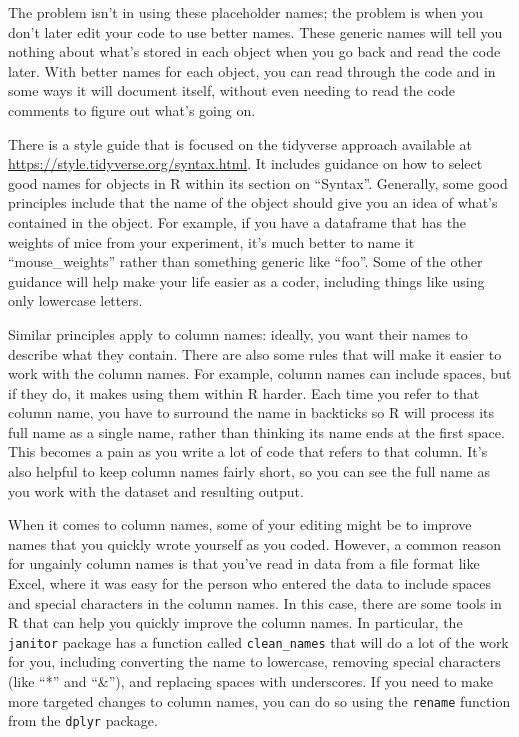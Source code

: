 \documentclass[]{tufte-book}
\begin{document}
The problem isn't in using these placeholder names; the problem is when you
don't later edit your code to use better names. These generic names
will tell you nothing about what's stored in each object when you go back
and read the code later. With better names for each object, you can read through
the code and in some ways it will document itself, without even needing to
read the code comments to figure out what's going on.

There is a style guide that is focused on the tidyverse approach available
at \url{https://style.tidyverse.org/syntax.html}. It includes guidance on how to
select good names for objects in R within its section on ``Syntax''. Generally,
some good principles include that the name of the object should give you an
idea of what's contained in the object. For example, if you have a dataframe
that has the weights of mice from your experiment, it's much better to name
it ``mouse\_weights'' rather than something generic like ``foo''. Some of the
other guidance will help make your life easier as a coder, including things
like using only lowercase letters.

Similar principles apply to column names: ideally, you want
their names to describe what they contain. There are also some rules that will
make it easier to work with the column names. For example, column names can
include spaces, but if they do, it makes using them within R harder. Each time
you refer to that column name, you have to surround the name in backticks so R
will process its full name as a single name, rather than thinking its name ends
at the first space. This becomes a pain as you write a lot of code that refers
to that column. It's also helpful to keep column names fairly short, so you can
see the full name as you work with the dataset and resulting output.

When it comes to column names, some of your editing might be to improve names
that you quickly wrote yourself as you coded. However, a common reason for
ungainly column names is that you've read in data from a file format like Excel,
where it was easy for the person who entered the data to include spaces and
special characters in the column names. In this case, there are some tools in
R that can help you quickly improve the column names. In particular, the
\texttt{janitor} package has a function called \texttt{clean\_names} that will do a lot of the
work for you, including converting the name to lowercase, removing special
characters (like ``*'' and ``\&''), and replacing spaces with underscores. If you
need to make more targeted changes to column names, you can do so using the
\texttt{rename} function from the \texttt{dplyr} package.
\end{document}
